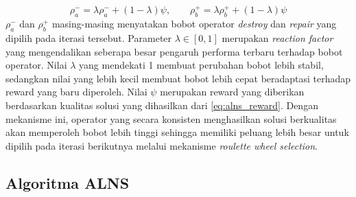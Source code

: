 \documentclass{file/TA-ITS}
\theoremstyle{definition}
\theoremstyle{definition}
\theoremstyle{plain}
\begin{document}
\begin{equation}
\label{eq:alns_weight_update}
\rho_a^-=\lambda\rho_a^-+(1-\lambda)\psi,
\qquad
\rho_b^+=\lambda\rho_b^++(1-\lambda)\psi
\end{equation}
$\rho_a^-$ dan $\rho_b^+$ masing-masing menyatakan bobot operator \textit{destroy} dan \textit{repair} yang dipilih pada iterasi tersebut. Parameter $\lambda\in[0,1]$ merupakan \textit{reaction factor} yang mengendalikan seberapa besar pengaruh performa terbaru terhadap bobot operator. Nilai $\lambda$ yang mendekati 1 membuat perubahan bobot lebih stabil, sedangkan nilai yang lebih kecil membuat bobot lebih cepat beradaptasi terhadap reward yang baru diperoleh. Nilai $\psi$ merupakan reward yang diberikan berdasarkan kualitas solusi yang dihasilkan dari \ref{eq:alns_reward}. Dengan mekanisme ini, operator yang secara konsisten menghasilkan solusi berkualitas akan memperoleh bobot lebih tinggi sehingga memiliki peluang lebih besar untuk dipilih pada iterasi berikutnya melalui mekanisme \textit{roulette wheel selection}.
\subsection{Algoritma ALNS}
\end{document}
